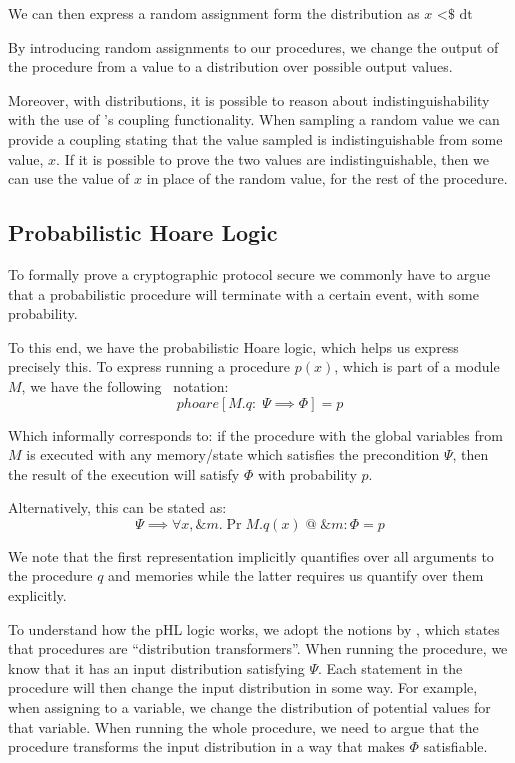 We can then express a random assignment form the distribution as $x \text{ <\$} \text{ dt}$


By introducing random assignments to our procedures, we change
the output of the procedure from a value to a distribution over possible output values.

Moreover, with distributions, it is possible to reason about indistinguishability
with the use of \easycrypt's coupling functionality. When sampling a random
value we can provide a coupling stating that the value sampled is
indistinguishable from some value, $x$. If it is possible to prove the two
values are indistinguishable, then we can use the value of $x$ in place of the
random value, for the rest of the procedure.


\subsection{Probabilistic Hoare Logic}
\label{sec:pHL}
To formally prove a cryptographic protocol secure we commonly have to argue
that a probabilistic procedure will terminate with a certain event,
with some probability.

To this end, we have the probabilistic Hoare logic, which helps us express precisely this.
To express running a procedure $p(x)$, which is part of a module $M$, we have the
following \easycrypt\ notation:
\[
  phoare[M.q :\; \Psi \implies \Phi] = p
\]

Which informally corresponds to: if the procedure with the global variables from $M$
is executed with any memory/state which satisfies the precondition $\Psi$, then the
result of the execution will satisfy $\Phi$ with probability $p$.

Alternatively, this can be stated as:
\begin{equation}
  \label{eq:proc_pr}
  \Psi \implies \forall x, \&m.\Pr{M.q(x) \; @ \; \&m : \Phi} = p
\end{equation}

We note that the first representation implicitly quantifies over all
arguments to the procedure $q$ and memories while the latter requires us
quantify over them explicitly.

To understand how the pHL logic works, we adopt the notions by \citet{ec_intro},
which states that procedures are ``distribution transformers''.
When running the procedure, we know that it has an input distribution satisfying
$\Psi$. Each statement in the procedure will then change the input distribution
in some way. For example, when assigning to a variable, we change the
distribution of potential values for that variable. When running the whole
procedure, we need to argue that the procedure transforms the input distribution
in a way that makes $\Phi$ satisfiable.

